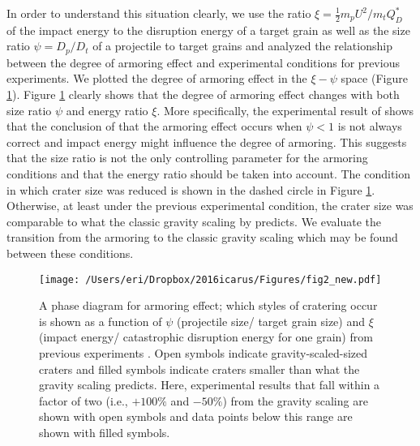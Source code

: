 \documentclass[3p,authoryear]{elsarticle}
\begin{document}
In order to understand this situation clearly, we use the ratio  $\xi =\frac{1}{2}m_pU^2/m_tQ_D^*$ of the impact energy to the disruption energy of a target grain as well as the size ratio $\psi=D_p/D_t$ of a projectile to target grains and analyzed the relationship between the degree of armoring effect and experimental conditions for previous experiments. We plotted the degree of armoring effect in the $\xi - \psi$ space (Figure \ref{phase}). Figure \ref{phase} clearly shows that the degree of armoring effect changes with both size ratio $\psi$ and energy ratio $\xi$.
More specifically, the experimental result of \citet{holsapple2014} shows that the conclusion of \citet{guettler2012} that the armoring effect occurs when $\psi<1$ is not always correct and impact energy might influence the degree of armoring.
This suggests that the size ratio is not the only controlling parameter for the armoring conditions and that the energy ratio should be taken into account.
The condition in which crater size was reduced is shown in the dashed circle in Figure \ref{phase}. Otherwise, at least under the previous experimental condition, the crater size was comparable to what the classic gravity scaling by \citet{holsapple1993} predicts.
We evaluate the transition from the armoring to the classic gravity scaling which may be found between these conditions.
\begin{figure}[htbp]
\begin{center}
	\texttt{[image: /Users/eri/Dropbox/2016icarus/Figures/fig2\_new.pdf]}
	\caption{A phase diagram for armoring effect; which styles of cratering occur is shown as a function of $\psi$ (projectile size/ target grain size) and $\xi$ (impact energy/ catastrophic disruption energy for one grain) from previous experiments \citep{cintala1999,guettler2012,holsapple2014}. Open symbols indicate gravity-scaled-sized craters \citep{holsapple1993} and filled symbols indicate craters smaller than what the gravity scaling predicts. Here, experimental results that fall within a factor of two (i.e., $+100\%$ and $-50\%$) from the gravity scaling are shown with open symbols and data points below this range are shown with filled symbols.}
	\label{phase}
\end{center}
\end{figure}
\end{document}

